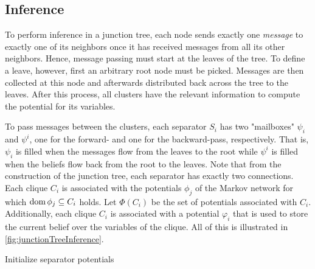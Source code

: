 		\subsection{Inference}
			To perform inference in a junction tree, each node sends exactly one \emph{message} to exactly one of its neighbors once it has received messages from all its other neighbors. Hence, message passing must start at the leaves of the tree. To define a leave, however, first an arbitrary root node must be picked. Messages are then collected at this node and afterwards distributed back across the tree to the leaves. After this process, all clusters have the relevant information to compute the potential for its variables.

			To pass messages between the clusters, each separator \(S_i\) has two "mailboxes" \( \psi_i \) and \( \psi^i \), one for the forward- and one for the backward-pass, respectively. That is, \(\psi_i\) is filled when the messages flow from the leaves to the root while \(\psi^i\) is filled when the beliefs flow back from the root to the leaves. Note that from the construction of the junction tree, each separator has exactly two connections. Each clique \( C_i \) is associated with the potentials \( \phi_j \) of the Markov network for which \( \operatorname{dom} \phi_j \subseteq C_i \) holds. Let \( \Phi(C_i) \) be the set of potentials associated with \(C_i\). Additionally, each clique \(C_i\) is associated with a potential \(\varphi_i\) that is used to store the current belief over the variables of the clique. All of this is illustrated in \autoref{fig:junctionTreeInference}.

			\begin{algorithm}
				Initialize separator potentials
			\end{algorithm}


